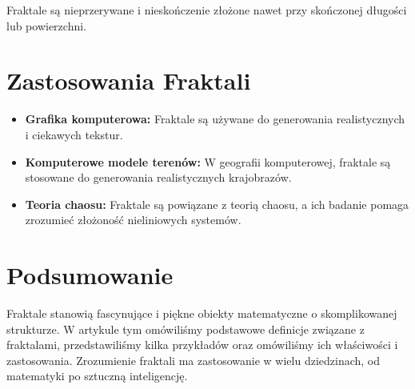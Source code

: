 \documentclass[12pt]{article}
\begin{document}
\begin{theorem}
Fraktale są nieprzerywane i nieskończenie złożone nawet przy skończonej długości lub powierzchni.
\end{theorem}

\section{Zastosowania Fraktali}
\begin{itemize}
  \item \textbf{Grafika komputerowa:} Fraktale są używane do generowania realistycznych i ciekawych tekstur.
  \item \textbf{Komputerowe modele terenów:} W geografii komputerowej, fraktale są stosowane do generowania realistycznych krajobrazów.
  \item \textbf{Teoria chaosu:} Fraktale są powiązane z teorią chaosu, a ich badanie pomaga zrozumieć złożoność nieliniowych systemów.
\end{itemize}

\section{Podsumowanie}
Fraktale stanowią fascynujące i piękne obiekty matematyczne o skomplikowanej strukturze. W artykule tym omówiliśmy podstawowe definicje związane z fraktalami, przedstawiliśmy kilka przykładów oraz omówiliśmy ich właściwości i zastosowania. Zrozumienie fraktali ma zastosowanie w wielu dziedzinach, od matematyki po sztuczną inteligencję. 
\end{document}

